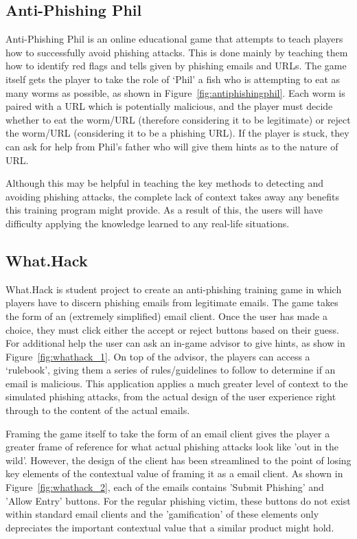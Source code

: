 \documentclass{l4proj}
\begin{document}
\subsection{Anti-Phishing Phil}
Anti-Phishing Phil \citep{sheng2007anti} is an online educational game that attempts to teach players how to successfully avoid phishing attacks. This is done mainly by teaching them how to identify red flags and tells given by phishing emails and URLs. The game itself gets the player to take the role of ‘Phil’ a fish who is attempting to eat as many worms as possible, as shown in Figure~\ref{fig:antiphishingphil}. Each worm is paired with a URL which is potentially malicious, and the player must decide whether to eat the worm/URL (therefore considering it to be legitimate) or reject the worm/URL (considering it to be a phishing URL). If the player is stuck, they can ask for help from Phil’s father who will give them hints as to the nature of URL. 

Although this may be helpful in teaching the key methods to detecting and avoiding phishing attacks, the complete lack of context takes away any benefits this training program might provide. As a result of this, the users will have difficulty applying the knowledge learned to any real-life situations. 

\subsection{What.Hack}
What.Hack \citep{wen2019hack} is student project to create an anti-phishing training game in which players have to discern phishing emails from legitimate emails. The game takes the form of an (extremely simplified) email client. Once the user has made a choice, they must click either the accept or reject buttons based on their guess. For additional help the user can ask an in-game advisor to give hints, as show in Figure~\ref{fig:whathack_1}. On top of the advisor, the players can access a ‘rulebook’, giving them a series of rules/guidelines to follow to determine if an email is malicious. This application applies a much greater level of context to the simulated phishing attacks, from the actual design of the user experience  right through to the content of the actual emails. 

Framing the game itself to take the form of an email client gives the player a greater frame of reference for what actual phishing attacks look like 'out in the wild'. However, the design of the client has been streamlined to the point of losing key elements of the contextual value of framing it as a email client. As shown in Figure~\ref{fig:whathack_2}, each of the emails contains 'Submit Phishing' and 'Allow Entry' buttons. For the regular phishing victim, these buttons do not exist within standard email clients and the 'gamification' of these elements only depreciates the important contextual value that a similar product might hold.
\end{document}
